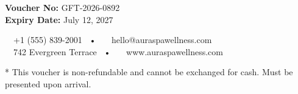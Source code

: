 \documentclass[10pt]{article}
\begin{document}
\begin{tcolorbox}
\begin{minipage}[t][\dimexpr\textheight-50pt\relax][t]{17.0cm}
  \vspace{\fill}
  
  \begin{minipage}[b]{6.5cm}
    \vspace{0pt}
    {\sffamily\small
      \textbf{Voucher No:} {\color{brandgreen}GFT-2026-0892} \\
      \textbf{Expiry Date:} {\color{brandgreen}July 12, 2027}
    }
  \end{minipage}%
  \hfill
  \begin{minipage}[b]{10.0cm}
    \vspace{0pt}
    \raggedleft\sffamily\scriptsize\color{textgray}
    \faPhone*~~+1 (555) 839-2001 ~•~ \faEnvelope~~hello@auraspawellness.com \\
    \faMapMarker*~~742 Evergreen Terrace ~•~ \faGlobe~~www.auraspawellness.com
  \end{minipage}
  
  \vspace{0.8em}
  \begin{center}
    {\sffamily\tiny\color{textgray}
      * This voucher is non-refundable and cannot be exchanged for cash. Must be presented upon arrival.
    }
  \end{center}
\end{minipage}
\end{tcolorbox}
\end{document}
